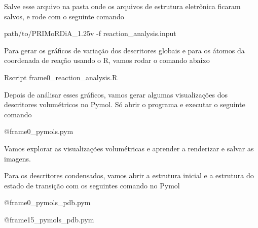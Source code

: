 \documentclass[a4paper,11pt]{refart}
\begin{document}
	Salve esse arquivo na pasta onde os arquivos de estrutura eletrônica ficaram salvos, e rode com o seguinte comando 
	
	\hspace*{-\leftmarginwidth}
	\begin{minipage}{\fullwidth}
		\begin{commandshell}path/to/PRIMoRDiA_1.25v -f reaction_analysis.input\end{commandshell}
	\end{minipage}

	Para gerar os gráficos de variação dos descritores globais e para os átomos da coordenada de reação usando o R, vamos rodar o comando abaixo
	
	
	\hspace*{-\leftmarginwidth}
	\begin{minipage}{\fullwidth}
		\begin{commandshell}Rscript frame0_reaction_analysis.R\end{commandshell}
	\end{minipage}

	Depois de análisar esses gráficos, vamos gerar algumas visualizações dos descritores volumétricos no Pymol. Só abrir o programa e executar o seguinte comando
	
	
 	\hspace*{-\leftmarginwidth}
	\begin{minipage}{\fullwidth}\begin{pymol}@frame0_pymols.pym\end{pymol}
	\end{minipage}
	
	Vamos explorar as visualizações volumétricas e aprender a renderizar e salvar as imagens. 
	
	Para os descritores condensados, vamos abrir a estrutura inicial e a estrutura do estado de transição com os seguintes comando no Pymol 
	
	\hspace*{-\leftmarginwidth}
	\begin{minipage}{\fullwidth}\begin{pymol}@frame0_pymols_pdb.pym\end{pymol}
	\end{minipage}


	\hspace*{-\leftmarginwidth}
	\begin{minipage}{\fullwidth}\begin{pymol}@frame15_pymols_pdb.pym\end{pymol}
	\end{minipage}
\end{document}
